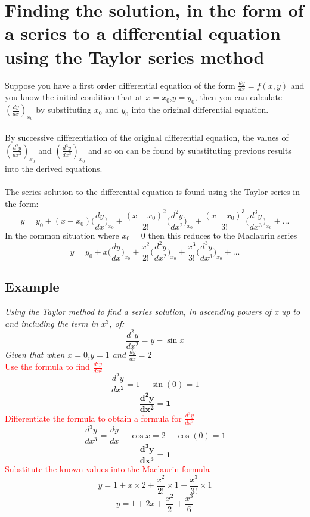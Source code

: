\documentclass{article}[18pt]
\begin{document}
\newpage
\section{Finding the solution, in the form of a series to a differential equation using the Taylor series method}
Suppose you have a first order differential equation of the form $\frac{dy}{dx}=f(x,y)$ and you know the initial condition that at $x=x_0$,$y=y_0$, then you can calculate \Large{$(\frac{dy}{dx})_{x_0}$} \normalsize by substituting $x_0$ and $y_0$ into the original differential equation.\\
\\
By successive differentiation of the original differential equation, the values of {\Large $(\frac{d^2y}{dx^2})_{x_0}$} and {\Large $(\frac{d^3y}{dx^3})_{x_0}$} and so on can be found by substituting previous results into the derived equations.\\
\\
The series solution to the differential equation is found using the Taylor series in the form:
$$y=y_0+(x-x_0)\bigg(\frac{dy}{dx}\bigg)_{x_0}+\frac{(x-x_0)^2}{2!}\Bigg(\frac{d^2y}{dx^2}\Bigg)_{x_0}+\frac{(x-x_0)^3}{3!}\Bigg(\frac{d^3y}{dx^3}\Bigg)_{x_0}+...$$
In the common situation where $x_0=0$ then this reduces to the Maclaurin series
$$y=y_0+x\bigg(\frac{dy}{dx}\bigg)_{x_0}+\frac{x^2}{2!}\Bigg(\frac{d^2y}{dx^2}\Bigg)_{x_0}+\frac{x^3}{3!}\Bigg(\frac{d^3y}{dx^3}\Bigg)_{x_0}+...$$
\subsection{Example}
\textit{Using the Taylor method to find a series solution, in ascending powers of x up to and including the term in $x^3$, of:}
$$\frac{d^2y}{dx^2}=y-\sin x$$
\textit{Given that when $x=0$,$y=1$ and $\frac{dy}{dx}=2$}
\\
\textcolor{red}{Use the formula to find $\frac{d^2y}{dx^2}$}
$$\frac{d^2y}{dx^2}=1-\sin(0)=1$$
$$\mathbf{\frac{d^2y}{dx^2}=1}$$
\textcolor{red}{Differentiate the formula to obtain a formula for $\frac{d^3y}{dx^3}$}
$$\frac{d^3y}{dx^3}=\frac{dy}{dx}-\cos x=2-\cos(0)=1$$
$$\mathbf{\frac{d^3y}{dx^3}=1}$$
\textcolor{red}{Substitute the known values into the Maclaurin formula}
$$y=1+x\times2+\frac{x^2}{2!}\times1+\frac{x^3}{3!}\times1$$
$$y=1+2x+\frac{x^2}{2}+\frac{x^3}{6}$$
\end{document}
